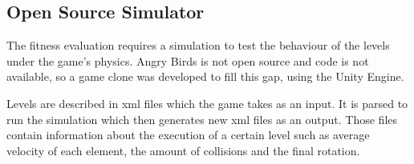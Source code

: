 \subsection{Open Source Simulator}

The fitness evaluation requires a simulation to test the behaviour of the levels under the game's physics. Angry Birds is not open source and code is not available, so a game clone was developed to fill this gap, using the Unity Engine. 

Levels are described in xml files which the game takes as an input. It is parsed to run the simulation which then generates new xml files as an output. Those files contain information about the execution of a certain level such as average velocity of each element, the amount of collisions and the final rotation. 
